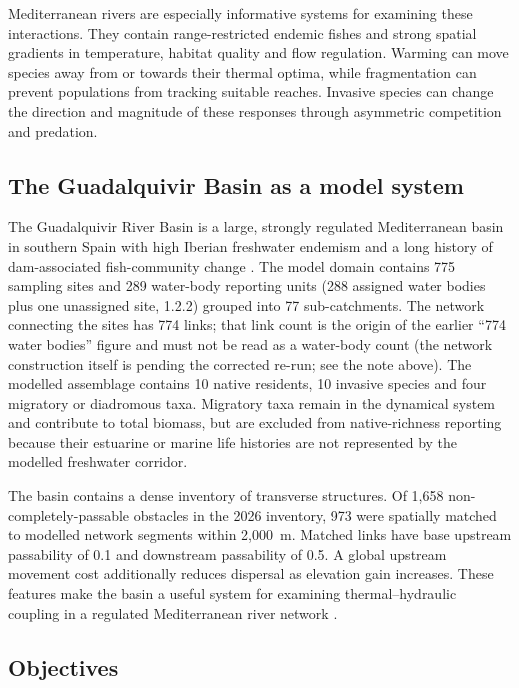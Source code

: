 \documentclass[11pt,a4paper]{article}
\begin{document}
Mediterranean rivers are especially informative systems for examining these interactions. They contain range-restricted endemic fishes and strong spatial gradients in temperature, habitat quality and flow regulation. Warming can move species away from or towards their thermal optima, while fragmentation can prevent populations from tracking suitable reaches. Invasive species can change the direction and magnitude of these responses through asymmetric competition and predation.

\subsection{The Guadalquivir Basin as a model system}

The Guadalquivir River Basin is a large, strongly regulated Mediterranean basin in southern Spain with high Iberian freshwater endemism and a long history of dam-associated fish-community change \cite{Herrera2022,RamosMerchante2018}. The model domain contains 775 sampling sites and 289 water-body reporting units (288 assigned water bodies plus one unassigned site, 1.2.2) grouped into 77 sub-catchments. The network connecting the sites has 774 links; that link count is the origin of the earlier ``774 water bodies'' figure and must not be read as a water-body count (the network construction itself is pending the corrected re-run; see the note above). The modelled assemblage contains 10 native residents, 10 invasive species and four migratory or diadromous taxa. Migratory taxa remain in the dynamical system and contribute to total biomass, but are excluded from native-richness reporting because their estuarine or marine life histories are not represented by the modelled freshwater corridor.

The basin contains a dense inventory of transverse structures. Of 1,658 non-completely-passable obstacles in the 2026 inventory, 973 were spatially matched to modelled network segments within 2,000~m. Matched links have base upstream passability of 0.1 and downstream passability of 0.5. A global upstream movement cost additionally reduces dispersal as elevation gain increases. These features make the basin a useful system for examining thermal--hydraulic coupling in a regulated Mediterranean river network \cite{PerkinGido2012,Larsenetal2021}.

\subsection{Objectives}
\end{document}
